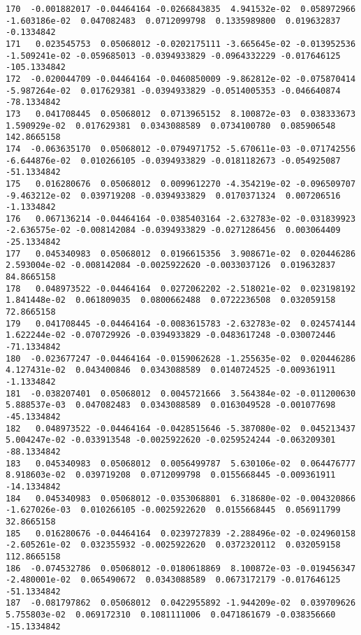 \documentclass[15pt,a4paper,openright]{article}
\begin{document}
\begin{lstlisting}[language=AMPL, caption = data file]
170  -0.001882017 -0.04464164 -0.0266843835  4.941532e-02  0.058972966 -1.603186e-02  0.047082483  0.0712099798  0.1335989800  0.019632837   -0.1334842
171   0.023545753  0.05068012 -0.0202175111 -3.665645e-02 -0.013952536 -1.509241e-02 -0.059685013 -0.0394933829 -0.0964332229 -0.017646125 -105.1334842
172  -0.020044709 -0.04464164 -0.0460850009 -9.862812e-02 -0.075870414 -5.987264e-02  0.017629381 -0.0394933829 -0.0514005353 -0.046640874  -78.1334842
173   0.041708445  0.05068012  0.0713965152  8.100872e-03  0.038333673  1.590929e-02  0.017629381  0.0343088589  0.0734100780  0.085906548  142.8665158
174  -0.063635170  0.05068012 -0.0794971752 -5.670611e-03 -0.071742556 -6.644876e-02  0.010266105 -0.0394933829 -0.0181182673 -0.054925087  -51.1334842
175   0.016280676  0.05068012  0.0099612270 -4.354219e-02 -0.096509707 -9.463212e-02  0.039719208 -0.0394933829  0.0170371324  0.007206516   -1.1334842
176   0.067136214 -0.04464164 -0.0385403164 -2.632783e-02 -0.031839923 -2.636575e-02 -0.008142084 -0.0394933829 -0.0271286456  0.003064409  -25.1334842
177   0.045340983  0.05068012  0.0196615356  3.908671e-02  0.020446286  2.593004e-02 -0.008142084 -0.0025922620 -0.0033037126  0.019632837   84.8665158
178   0.048973522 -0.04464164  0.0272062202 -2.518021e-02  0.023198192  1.841448e-02  0.061809035  0.0800662488  0.0722236508  0.032059158   72.8665158
179   0.041708445 -0.04464164 -0.0083615783 -2.632783e-02  0.024574144  1.622244e-02 -0.070729926 -0.0394933829 -0.0483617248 -0.030072446  -71.1334842
180  -0.023677247 -0.04464164 -0.0159062628 -1.255635e-02  0.020446286  4.127431e-02  0.043400846  0.0343088589  0.0140724525 -0.009361911   -1.1334842
181  -0.038207401  0.05068012  0.0045721666  3.564384e-02 -0.011200630  5.888537e-03  0.047082483  0.0343088589  0.0163049528 -0.001077698  -45.1334842
182   0.048973522 -0.04464164 -0.0428515646 -5.387080e-02  0.045213437  5.004247e-02 -0.033913548 -0.0025922620 -0.0259524244 -0.063209301  -88.1334842
183   0.045340983  0.05068012  0.0056499787  5.630106e-02  0.064476777  8.918603e-02  0.039719208  0.0712099798  0.0155668445 -0.009361911  -14.1334842
184   0.045340983  0.05068012 -0.0353068801  6.318680e-02 -0.004320866 -1.627026e-03  0.010266105 -0.0025922620  0.0155668445  0.056911799   32.8665158
185   0.016280676 -0.04464164  0.0239727839 -2.288496e-02 -0.024960158 -2.605261e-02  0.032355932 -0.0025922620  0.0372320112  0.032059158  112.8665158
186  -0.074532786  0.05068012 -0.0180618869  8.100872e-03 -0.019456347 -2.480001e-02  0.065490672  0.0343088589  0.0673172179 -0.017646125  -51.1334842
187  -0.081797862  0.05068012  0.0422955892 -1.944209e-02  0.039709626  5.755803e-02  0.069172310  0.1081111006  0.0471861679 -0.038356660  -15.1334842

\end{lstlisting}
\end{document}
